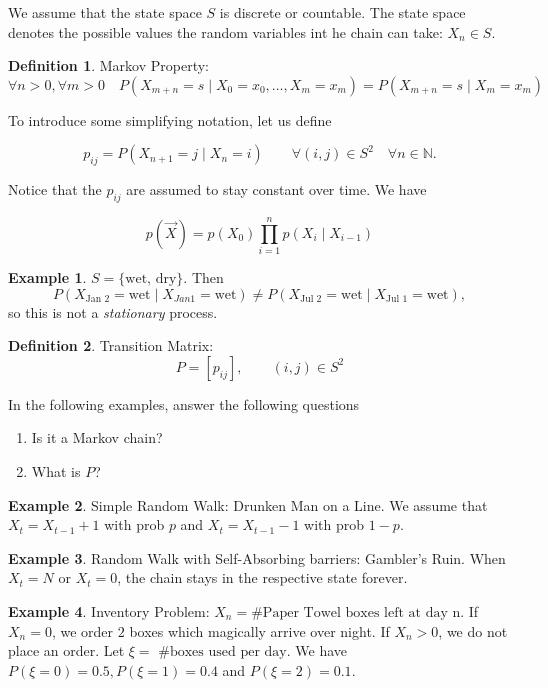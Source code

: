 \documentclass{article}
\theoremstyle{definition}
\newtheorem{exmp}{Example}[section]
\newtheorem{defn}{Definition}[section]
\begin{document}
We assume that the state space $S$ is discrete or countable. The state space denotes the possible values the random variables int he chain can take: $X_n \in S$.

\begin{defn}{Markov Property:}
$$
\forall n > 0, \forall m > 0 \quad P\left( X_{m+n} = s \mid X_0 = x_0 , \ldots, X_m = x_m \right) = P \left( X_{m+n} = s \mid X_m = x_m \right)
$$
\end{defn}

To introduce some simplifying notation, let us define

$$
p_{ij} = P(X_{n+1} = j \mid X_n = i) \qquad \forall (i,j) \in S^2 \quad \forall n \in \mathbb{N}.
$$

Notice that the $p_{ij}$ are assumed to stay constant over time. We have

$$
p( \vec X ) = p(X_0) \prod_{i=1}^n p(X_i \mid X_{i-1})
$$

\begin{exmp}
$S = \{ \text{wet, dry} \}$. Then
$$
P \left(X_{\text{Jan 2}} = \text{wet} \mid X_{Jan 1} = \text{wet} \right) \ne P \left(X_{\text{Jul 2}} = \text{wet} \mid X_{\text{Jul 1}} = \text{wet} \right),
$$
so this is not a \emph{stationary} process.
\end{exmp}

\begin{defn}
Transition Matrix:
$$
P = \left[ p_{ij} \right], \qquad (i,j) \in S^2
$$
\end{defn}

In the following examples, answer the following questions

\begin{enumerate}
\item Is it a Markov chain?
\item What is $P$?
\end{enumerate}

\begin{exmp} Simple Random Walk: Drunken Man on a Line. We assume that $X_t = X_{t-1} + 1$ with prob $p$ and $X_t = X_{t-1} - 1$ with prob $1-p$.
\end{exmp}

\begin{exmp} Random Walk with Self-Absorbing barriers: Gambler's Ruin. When $X_t = N$ or $X_t = 0$, the chain stays in the respective state forever.
\end{exmp}

\begin{exmp} Inventory Problem:
$X_n = \text{\# Paper Towel boxes left at day n}$.
If $X_n = 0$, we order $2$ boxes which magically arrive over night. If $X_n > 0$, we do not place an order. Let $\xi = \text{ \# boxes used per day}$. We have $P(\xi = 0) = 0.5, P(\xi = 1) =0.4$ and $P(\xi = 2) = 0.1$.
\end{exmp}
\end{document}
